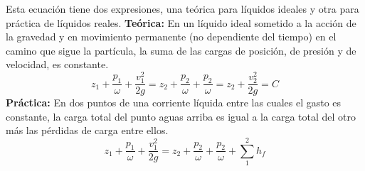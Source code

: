 \begin{theorem}
    Esta ecuación tiene dos expresiones, una teórica para líquidos ideales y otra para práctica de líquidos reales.
    \textbf{Teórica:} En un líquido ideal sometido a la acción de la gravedad y en movimiento permanente (no dependiente del tiempo) en el camino que sigue la partícula, la suma de las cargas de posición, de presión y de velocidad, es constante.
    \begin{equation}
        z_1 + \frac{p_1}{\omega} + \frac{v^{2}_1}{2g} = z_2 + \frac{p_2}{\omega}+ \frac{p_2}{\omega} = z_2 +\frac{v^{2}_2}{2g} = C
    \end{equation}
    \textbf{Práctica:} En dos puntos de una corriente líquida entre las cuales el gasto es constante, la carga total del punto aguas arriba es igual a la carga total del otro más las pérdidas de carga entre ellos.
    \begin{equation}
        z_1 + \frac{p_1}{\omega} + \frac{v^{2}_1}{2g} = z_2 + \frac{p_2}{\omega}+ \frac{p_2}{\omega} +\sum_1^2 h_f
    \end{equation}
\end{theorem}
